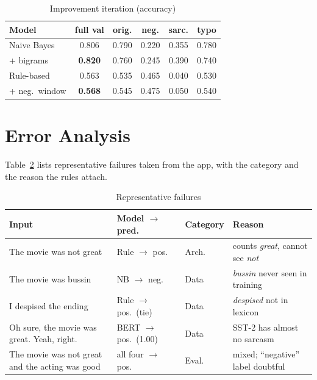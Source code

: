 \documentclass[conference]{IEEEtran}
\begin{document}
\begin{table}[t]
\centering
\caption{Improvement iteration (accuracy)}
\label{tab:improve}
\footnotesize
\setlength{\tabcolsep}{3pt}
\begin{tabular}{@{}lccccc@{}}
\toprule
\textbf{Model} & \textbf{full val} & \textbf{orig.} & \textbf{neg.} & \textbf{sarc.} & \textbf{typo} \\
\midrule
Naive Bayes           & 0.806 & 0.790 & 0.220 & 0.355 & 0.780 \\
\quad + bigrams       & \textbf{0.820} & 0.760 & 0.245 & 0.390 & 0.740 \\
Rule-based            & 0.563 & 0.535 & 0.465 & 0.040 & 0.530 \\
\quad + neg.\ window  & \textbf{0.568} & 0.545 & 0.475 & 0.050 & 0.540 \\
\bottomrule
\end{tabular}
\end{table}

\section{Error Analysis}\label{sec:error}
Table~\ref{tab:cases} lists representative failures taken from the app, with the category and the
reason the rules attach.

\begin{table}[t]
\centering
\caption{Representative failures}
\label{tab:cases}
\footnotesize
\begin{tabular}{@{}p{2.6cm}p{1.35cm}p{1.15cm}p{2.0cm}@{}}
\toprule
\textbf{Input} & \textbf{Model $\rightarrow$ pred.} & \textbf{Category} & \textbf{Reason} \\
\midrule
The movie was not great & Rule $\rightarrow$ pos. & Arch. & counts \emph{great}, cannot see \emph{not} \\
The movie was bussin & NB $\rightarrow$ neg. & Data & \emph{bussin} never seen in training \\
I despised the ending & Rule $\rightarrow$ pos.\ (tie) & Data & \emph{despised} not in lexicon \\
Oh sure, the movie was great. Yeah, right. & BERT $\rightarrow$ pos.\ (1.00) & Data & SST-2 has almost no sarcasm \\
The movie was not great and the acting was good & all four $\rightarrow$ pos. & Eval. & mixed; ``negative'' label doubtful \\
\bottomrule
\end{tabular}
\end{table}
\end{document}
